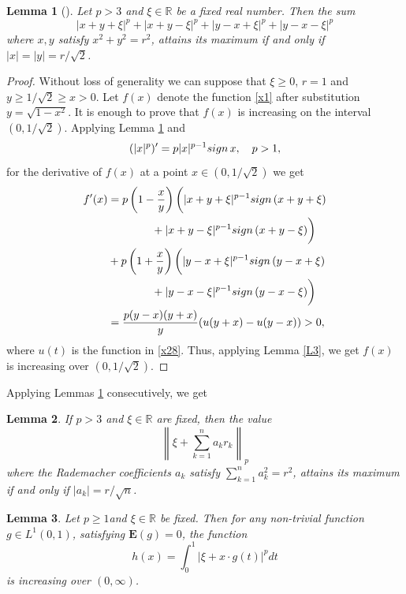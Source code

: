 \documentclass[12pt,reqno,fleqn]{amsart}
\newtheorem{lemma}{Lemma}[section]
\theoremstyle{definition}
\theoremstyle{definition}
\theoremstyle{remark}
\def\sign{{\rm sign\,}}
\def\ZR{\ensuremath{\mathbb R}}
\def\ZE{\ensuremath{\mathbf E}}
\numberwithin{equation}{section}
\newcommand {\e }[1]{\eqref{#1}}
\newcommand {\lem }[1]{Lemma \ref{#1}}
\begin{document}
\begin{lemma}[\cite{Whi}]\label{L4}
	Let $p>3$ and $\xi\in \ZR$ be a fixed real number. Then the sum
	\begin{equation}\label{x1}
		|x+y+\xi|^p+|x+y-\xi|^p+|y-x+\xi|^p+|y-x-\xi|^p
	\end{equation}
	where $x,y$ satisfy $x^2+y^2=r^2$, attains its maximum if and only if $|x|=|y|=r/\sqrt{2}$.
\end{lemma}
\begin{proof}

	Without loss of generality we can suppose that $\xi\ge 0$, $r=1$ and $y\ge 1/\sqrt{2}\ge x>0$. Let $f(x)$ denote the function \e{x1}  after substitution  $y= \sqrt{1-x^2}$. It is enough to prove that $f(x)$ is increasing on the interval $(0,1/\sqrt{2})$. Applying \lem{L4} and 
	\begin{equation*}
		(|x|^p)'=p|x|^{p-1}\sign x, \quad p>1,
	\end{equation*}
	for the derivative of $f(x)$ at a point $x\in (0,1/\sqrt 2)$ we get
	\begin{align}
		f'(x)&=p\left(1-\frac{x}{y}\right)\bigg(|x+y+\xi|^{p-1}\sign(x+y+\xi)\\
		&\qquad\qquad+|x+y-\xi |^{p-1}\sign(x+y-\xi)\bigg)\\
		&+p\left(1+\frac{x}{y}\right)\bigg(|y-x+\xi|^{p-1}\sign(y-x+\xi)\\
		&\qquad\qquad+|y-x-\xi |^{p-1}\sign(y-x-\xi)\bigg)\\
		&=\frac{p(y-x)(y+x)}{y}(u(y+x)-u(y-x))>0,
	\end{align}
	where $u(t)$ is the function in \e{x28}. Thus, applying \lem{L3}, we get $f(x)$ is increasing over $(0,1/\sqrt 2)$.
\end{proof}
Applying Lemmas \ref{L4} consecutively, we get 
\begin{lemma}\label{L6}
	If $p>3$ and $\xi\in \ZR$ are fixed, then the value
	\begin{equation}
		\left\|\xi+\sum_{k=1}^na_kr_k\right\|_p
	\end{equation}
	where the Rademacher coefficients $a_k$ satisfy $\sum_{k=1}^na_k^2=r^2$, attains its maximum if and only if $|a_k|=r/\sqrt{n}$.
\end{lemma}
\begin{lemma}\label{L8}
	Let $p\ge 1$and $\xi\in \ZR$ be fixed. Then for any non-trivial function $g\in L^1(0,1)$, satisfying $\ZE(g)=0$, the function
	\begin{equation}
		h(x)=\int_0^1\left|\xi+x\cdot g(t)\right|^pdt
	\end{equation}
is increasing over $(0,\infty)$.
\end{lemma}
\end{document}
